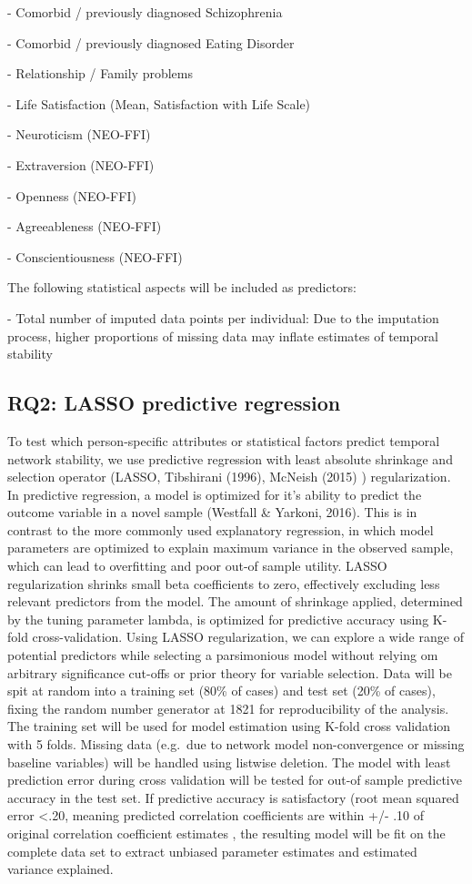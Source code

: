 \documentclass[
  english,
  man]{apa6}
\begin{document}
- Comorbid / previously diagnosed Schizophrenia

- Comorbid / previously diagnosed Eating Disorder

- Relationship / Family problems

- Life Satisfaction (Mean, Satisfaction with Life Scale)

- Neuroticism (NEO-FFI)

- Extraversion (NEO-FFI)

- Openness (NEO-FFI)

- Agreeableness (NEO-FFI)

- Conscientiousness (NEO-FFI)

The following statistical aspects will be included as predictors:

- Total number of imputed data points per individual: Due to the imputation process, higher proportions of missing data may inflate estimates of temporal stability

\hypertarget{rq2-lasso-predictive-regression}{%
\subsection{RQ2: LASSO predictive regression}\label{rq2-lasso-predictive-regression}}

To test which person-specific attributes or statistical factors predict temporal network stability, we use predictive regression with least absolute shrinkage and selection operator (LASSO, Tibshirani (1996), McNeish (2015) ) regularization. In predictive regression, a model is optimized for it's ability to predict the outcome variable in a novel sample (Westfall \& Yarkoni, 2016). This is in contrast to the more commonly used explanatory regression, in which model parameters are optimized to explain maximum variance in the observed sample, which can lead to overfitting and poor out-of sample utility. LASSO regularization shrinks small beta coefficients to zero, effectively excluding less relevant predictors from the model. The amount of shrinkage applied, determined by the tuning parameter lambda, is optimized for predictive accuracy using K-fold cross-validation. Using LASSO regularization, we can explore a wide range of potential predictors while selecting a parsimonious model without relying om arbitrary significance cut-offs or prior theory for variable selection. Data will be spit at random into a training set (80\% of cases) and test set (20\% of cases), fixing the random number generator at 1821 for reproducibility of the analysis. The training set will be used for model estimation using K-fold cross validation with 5 folds. Missing data (e.g.~due to network model non-convergence or missing baseline variables) will be handled using listwise deletion. The model with least prediction error during cross validation will be tested for out-of sample predictive accuracy in the test set. If predictive accuracy is satisfactory (root mean squared error \textless.20, meaning predicted correlation coefficients are within +/- .10 of original correlation coefficient estimates , the resulting model will be fit on the complete data set to extract unbiased parameter estimates and estimated variance explained.
\end{document}
